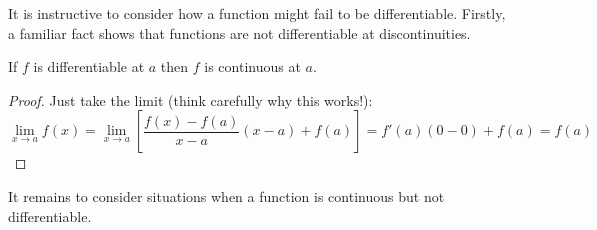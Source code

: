 
It is instructive to consider how a function might fail to be differentiable. Firstly, a familiar fact shows that functions are not differentiable at discontinuities.

\begin{lemm}{}{}
	If $f$ is differentiable at $a$ then $f$ is continuous at $a$.
\end{lemm}

\begin{proof}
	Just take the limit (think carefully why this works!):
	\[
		\lim_{x\to a}f(x)
		=\lim_{x\to a}\left[\frac{f(x)-f(a)}{x-a}(x-a)+f(a)\right] 
		=f'(a)(0-0)+f(a) 
		=f(a)\tag*{\qedhere}
	\]
\end{proof}

It remains to consider situations when a function is continuous but not differentiable.

